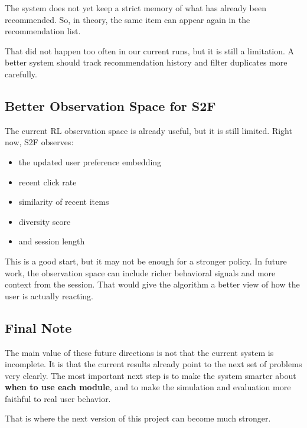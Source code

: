 The system does not yet keep a strict memory of what has already been recommended. 
So, in theory, the same item can appear again in the recommendation list.

That did not happen too often in our current runs, but it is still a limitation. 
A better system should track recommendation history and filter duplicates more carefully.




\subsection{Better Observation Space for S2F}

The current RL observation space is already useful, but it is still limited. 
Right now, S2F observes:

\begin{itemize}
    \item the updated user preference embedding
    \item recent click rate
    \item similarity of recent items
    \item diversity score
    \item and session length
\end{itemize}

This is a good start, but it may not be enough for a stronger policy. 
In future work, the observation space can include richer behavioral signals and more context from the session. 
That would give the algorithm a better view of how the user is actually reacting.




\subsection{Final Note}

The main value of these future directions is not that the current system is incomplete. 
It is that the current results already point to the next set of problems very clearly. 
The most important next step is to make the system smarter about \textbf{when to use each module}, 
and to make the simulation and evaluation more faithful to real user behavior.

That is where the next version of this project can become much stronger.
